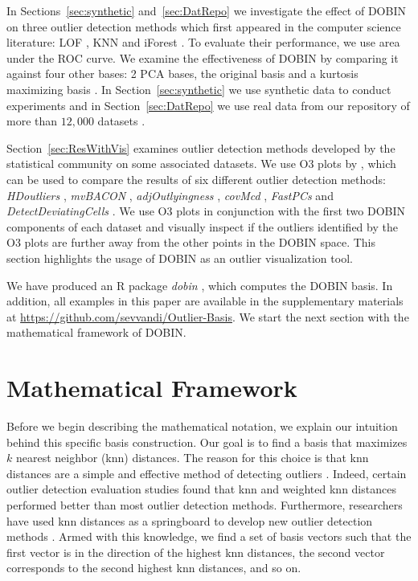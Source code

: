 \documentclass[letter,12pt]{article}
\begin{document}
In Sections~\ref{sec:synthetic} and~\ref{sec:DatRepo} we investigate the effect of DOBIN on three outlier detection methods which first appeared in the computer science literature: LOF \citep{breunig2000lof}, KNN \citep{ramaswamy2000efficient} and iForest \citep{liu2008isolation}. To evaluate their performance, we use area under the ROC curve. We examine the effectiveness of DOBIN by comparing it against {\color{blue} four other bases: 2 PCA bases,  the original basis and a kurtosis maximizing basis \citep{tyler2009invariant}}. In Section~\ref{sec:synthetic} we use synthetic data to conduct experiments and in Section~\ref{sec:DatRepo} we use real data from our repository of more than $12,000$ datasets \citep{datasets}.

Section~\ref{sec:ResWithVis} examines outlier detection methods developed by the statistical community on some associated datasets. We use O3 plots by \cite{unwin2019multivariate}, which can be used to compare the results of six different outlier detection methods: \textit{HDoutliers} \citep{wilkinson2017visualizing}, \textit{mvBACON} \citep{billor2000bacon}, \textit{adjOutlyingness} \citep{brys2005robustification}, \textit{covMcd} \citep{rousseeuw1999fast} , \textit{FastPCs} \citep{vakili2014finding} and \textit{DetectDeviatingCells} \citep{rousseeuw2018detecting}. We use O3 plots in conjunction with the first two DOBIN components of each dataset and visually inspect if the outliers identified by the O3 plots are further away from the other points in the DOBIN space. This section highlights the usage of DOBIN as an outlier visualization tool.

We have produced an R package \textit{dobin} \citep{dobin}, which computes the DOBIN basis. In addition, all examples in this paper are available in the supplementary materials at \url{https://github.com/sevvandi/Outlier-Basis}. We start the next section with the mathematical framework of DOBIN. %

\section{Mathematical Framework}\label{sec:MathFrame}
{\color{blue} Before we begin describing the mathematical notation, we explain our intuition behind this specific basis construction. Our goal is to find a basis that maximizes $k$ nearest neighbor (knn) distances. The reason for this choice is that knn distances are a simple and  effective method of detecting outliers \citep{ramaswamy2000efficient}. Indeed, certain outlier detection evaluation studies  \citep{campos2016evaluation, kandanaarachchi2018normalization, goldstein2016comparative} found that knn and weighted knn distances performed better than most outlier detection methods. Furthermore, researchers have used knn distances as a springboard to develop new outlier detection methods \citep{wilkinson2017visualizing}. Armed with this knowledge, we find a set of basis vectors such that the first vector is in the direction of the highest knn distances, the second vector corresponds to the second highest knn distances, and so on.   
 }
\end{document}
